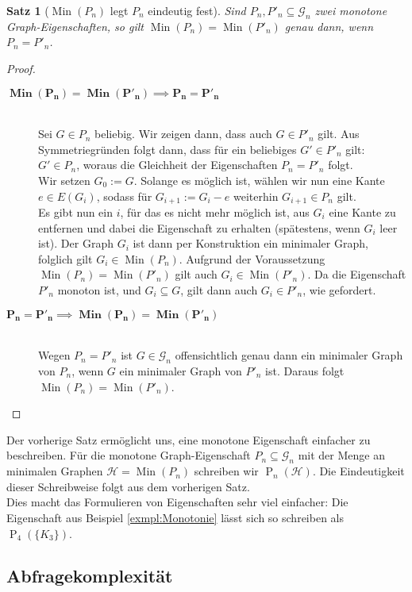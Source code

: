 \documentclass[a4paper]{scrreprt}
\newtheorem{Satz}[definition]{Satz}
\theoremstyle{definition}
\DeclareMathOperator\Min{Min}
\begin{document}
\begin{Satz}[$\Min(P_n)$ legt $P_n$ eindeutig fest]
Sind $P_n, P'_n \subseteq \mathcal{G}_n$ zwei monotone 
Graph-Eigenschaften, so gilt
$\Min(P_n) = \Min(P'_n)$ genau dann, wenn $P_n = P'_n$.
\end{Satz}
\begin{proof} \hfill
\begin{description}
\item[$\boldsymbol{\Min(P_n) = \Min(P'_n) \implies P_n = P'_n}$]
\hfill \\
Sei $G \in P_n$ beliebig. Wir zeigen dann, dass auch $G \in P'_n$
gilt. Aus Symmetriegründen folgt dann, dass für ein beliebiges 
$G' \in P'_n$ gilt: $G' \in P_n$, woraus die Gleichheit der
Eigenschaften $P_n = P'_n$ folgt. \\
Wir setzen $G_0 := G$. Solange es möglich ist, wählen wir nun
eine Kante $e \in E(G_i)$, sodass für $G_{i+1} := G_i - e$  
weiterhin $G_{i+1} \in P_n$ gilt. \\
Es gibt nun ein $i$, für das es nicht mehr möglich ist,
aus $G_i$ eine Kante zu entfernen und dabei die Eigenschaft
zu erhalten (spätestens, wenn $G_i$ leer ist).
Der Graph $G_i$ ist dann per Konstruktion ein minimaler
Graph, folglich gilt $G_i \in \Min(P_n)$. Aufgrund der
Voraussetzung $\Min(P_n) = \Min(P'_n)$ gilt auch 
$G_i \in \Min(P'_n)$. Da die Eigenschaft $P'_n$ monoton ist,
und $G_i \subseteq G$, gilt dann auch $G_i \in P'_n$,
wie gefordert.
\item[$\boldsymbol{P_n = P'_n \implies \Min(P_n) = \Min(P'_n)}$]
\hfill \\
Wegen $P_n = P'_n$ ist $G \in \mathcal{G}_n$ offensichtlich
genau dann ein minimaler Graph von $P_n$, wenn $G$ ein 
minimaler Graph von $P'_n$ ist. Daraus folgt 
$\Min(P_n) = \Min(P'_n)$.
\end{description}
\end{proof}
Der vorherige Satz ermöglicht uns, eine
monotone Eigenschaft einfacher zu beschreiben. 
Für die monotone Graph-Eigenschaft $P_n\subseteq \mathcal{G}_n$
mit der Menge an minimalen Graphen $\mathcal{H} = \Min(P_n)$
schreiben wir $\operatorname{P}_n(\mathcal{H})$. Die Eindeutigkeit dieser
Schreibweise folgt aus dem vorherigen Satz. \\
Dies macht das Formulieren von Eigenschaften sehr viel einfacher:
Die Eigenschaft aus Beispiel \ref{exmpl:Monotonie} lässt sich
so schreiben als $\operatorname{P}_4(\{K_3\})$.


\subsection{Abfragekomplexität}
\label{sec:queryComplexity}
\end{document}
